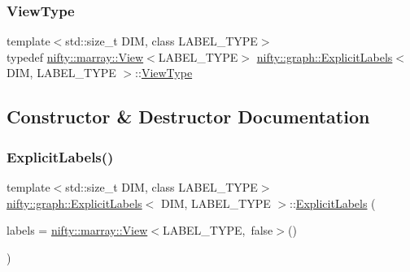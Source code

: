 \mbox{\label{classnifty_1_1graph_1_1ExplicitLabels_aaab98314403b95503bf0c32e65fd1884}} 
\subsubsection{\texorpdfstring{View\+Type}{ViewType}}
{\footnotesize\ttfamily template$<$std\+::size\+\_\+t D\+IM, class L\+A\+B\+E\+L\+\_\+\+T\+Y\+PE$>$ \\
typedef \hyperlink{classandres_1_1View}{nifty\+::marray\+::\+View}$<$L\+A\+B\+E\+L\+\_\+\+T\+Y\+PE$>$ \hyperlink{classnifty_1_1graph_1_1ExplicitLabels}{nifty\+::graph\+::\+Explicit\+Labels}$<$ D\+IM, L\+A\+B\+E\+L\+\_\+\+T\+Y\+PE $>$\+::\hyperlink{classnifty_1_1graph_1_1ExplicitLabels_aaab98314403b95503bf0c32e65fd1884}{View\+Type}}



\subsection{Constructor \& Destructor Documentation}
\mbox{\label{classnifty_1_1graph_1_1ExplicitLabels_ae503c70604d75e48d73622f8941cfa34}} 
\subsubsection{\texorpdfstring{Explicit\+Labels()}{ExplicitLabels()}}
{\footnotesize\ttfamily template$<$std\+::size\+\_\+t D\+IM, class L\+A\+B\+E\+L\+\_\+\+T\+Y\+PE$>$ \\
\hyperlink{classnifty_1_1graph_1_1ExplicitLabels}{nifty\+::graph\+::\+Explicit\+Labels}$<$ D\+IM, L\+A\+B\+E\+L\+\_\+\+T\+Y\+PE $>$\+::\hyperlink{classnifty_1_1graph_1_1ExplicitLabels}{Explicit\+Labels} (\begin{DoxyParamCaption}\item[{const \hyperlink{classandres_1_1View}{nifty\+::marray\+::\+View}$<$ L\+A\+B\+E\+L\+\_\+\+T\+Y\+PE, false $>$ \&}]{labels = {\ttfamily \hyperlink{classandres_1_1View}{nifty\+::marray\+::\+View}$<$LABEL\+\_\+TYPE,~false$>$()} }\end{DoxyParamCaption})\hspace{0.3cm}{\ttfamily [inline]}}



